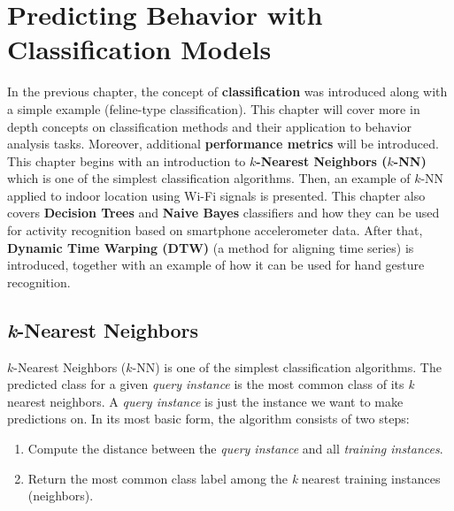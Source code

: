 \documentclass[
  11pt,
]{krantz}
\providecommand{\tightlist}{%
  \setlength{\itemsep}{0pt}\setlength{\parskip}{0pt}}
\begin{document}


\hypertarget{classification}{%
\chapter{Predicting Behavior with Classification Models}\label{classification}}

In the previous chapter, the concept of \textbf{classification} was introduced along with a simple example (feline-type classification). This chapter will cover more in depth concepts on classification methods and their application to behavior analysis tasks. Moreover, additional \textbf{performance metrics} will be introduced. This chapter begins with an introduction to \textbf{\(k\)-Nearest Neighbors (\(k\)-NN)} which is one of the simplest classification algorithms. Then, an example of \(k\)-NN applied to indoor location using Wi-Fi signals is presented. This chapter also covers \textbf{Decision Trees} and \textbf{Naive Bayes} classifiers and how they can be used for activity recognition based on smartphone accelerometer data. After that, \textbf{Dynamic Time Warping (DTW)} (a method for aligning time series) is introduced, together with an example of how it can be used for hand gesture recognition.

\hypertarget{k-nearest-neighbors}{%
\section{\texorpdfstring{\emph{k}-Nearest Neighbors}{k-Nearest Neighbors}}\label{k-nearest-neighbors}}

\(k\)-Nearest Neighbors (\(k\)-NN) is one of the simplest classification algorithms. The predicted class for a given \emph{query instance} is the most common class of its \emph{k} nearest neighbors. A \emph{query instance} is just the instance we want to make predictions on. In its most basic form, the algorithm consists of two steps:

\begin{enumerate}
\def\labelenumi{\arabic{enumi}.}
\tightlist
\item
  Compute the distance between the \emph{query instance} and all \emph{training instances}.
\item
  Return the most common class label among the \emph{k} nearest training instances (neighbors).
\end{enumerate}
\end{document}
